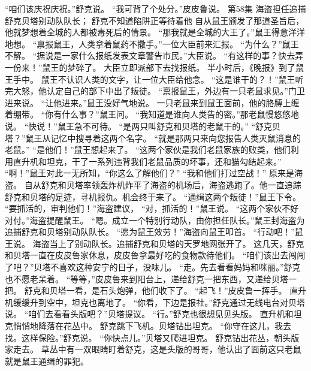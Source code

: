 \documentclass[a4paper,12pt,UTF8,twoside]{ctexbook}
\begin{document}
        “咱们该庆祝庆祝。”舒克说。 
        “我可背了个处分。”皮皮鲁说。   第58集 
        海盗担任追捕舒克贝塔别动队队长； 
        舒克不知道陷阱正等待着他   
        自从鼠王颁发了那道圣旨后，他就梦想着全城的人都被毒死后的情景。 
        “那我就是全城的大王了。”鼠王得意洋洋地想。 
        “禀报鼠王，人类拿着鼠药不撒手。”一位大臣前来汇报。 
        “为什么？”鼠王不解。 
        “据说是一家什么报纸发表文章警告市民。”大臣说。 
        “有这样的事？快去弄一份来！”鼠王的梦碎了。 
        大臣立即派部下去找报纸。 
        半小时后，《晚报》到了鼠王手中。 
        鼠王不认识人类的文字，让一位大臣给他念。 
        “这是谁干的？！”鼠王听完大怒，他认定自己的部下中出了叛徒。 
        “禀报鼠王，外边有一只老鼠求见。”门卫进来说。 
        “让他进来。”鼠王没好气地说。 
        一只老鼠来到鼠王面前，他的胳膊上缠着绷带。 
        “你有什么事？”鼠王问。 
        “我知道是谁向人类告的密。”那老鼠慢悠悠地说。 
        “快说！”鼠王急不可待。 
        “是两只叫舒克和贝塔的老鼠干的。” 
        “舒克贝塔？”鼠王从记忆中搜寻着这两个名字。 
        “就是那两只来向您报告人类灭鼠消息的老鼠。” 
        “是他们！”鼠王想起来了。 
        “这两个家伙是我们老鼠家族的败类，他们利用直升机和坦克，干了一系列违背我们老鼠品质的坏事，还和猫勾结起来。” 
        “啊！”鼠王对此一无所知，“你这么了解他们？” 
        “我和他们打过空战！” 
        原来是海盗。 
        自从舒克和贝塔率领轰炸机炸平了海盗的机场后，海盗逃跑了。他一直追踪舒克和贝塔的足迹，寻机报仇。机会终于来了。 
        “通缉这两个叛徒！”鼠王下令。 
        “要抓活的，审判他们！”海盗建议， 
        “对，抓活的！”鼠王说。 
        “这两个家伙不好对付。”海盗提醒鼠王。 
        “嗯。成立一个特别行动队，由你担任队长。”鼠王封海盗为追捕舒克和贝塔别动队队长。 
        “愿为鼠王效劳！”海盗向鼠王叩首。 
        “行动吧！”鼠王说。 
        海盗当上了别动队长。追捕舒克和贝塔的天罗地网张开了。 
        这几天，舒克和贝塔一直在皮皮鲁家休息，皮皮鲁拿最好吃的食物款待他们。 
        “咱们该出去闯闯了吧？”贝塔不喜欢这种安宁的日子，没味儿。 
        “走。先去看看妈妈和咪丽。”舒克也不愿老呆着。 
        “等等，”皮皮鲁来到阳台上，递给舒克一把东西，又递给贝塔一把。 
        舒克和贝塔一看，是石头炮弹，他们收下了。 
        “起飞！”皮皮鲁一挥手。 
        直升机缓缓升到空中，坦克也离地了。 
        “你看，下边是报社。”舒克通过无线电台对贝塔说。 
        “咱们去看看头版吧？”贝塔提议。 
        “行。”舒克也很想见见头版。 
        直升机和坦克悄悄地降落在花丛中。 
        舒克跳下飞机。贝塔钻出坦克。 
        “你守在这儿，我去找。这样保险。”舒克说。 
        “你快点儿。”贝塔又爬进坦克。 
        舒克钻出花丛，朝头版家走去。 
        草丛中有一双眼睛盯着舒克，这是头版的哥哥，他认出了面前这只老鼠就是鼠王通缉的罪犯。 
\end{document}
